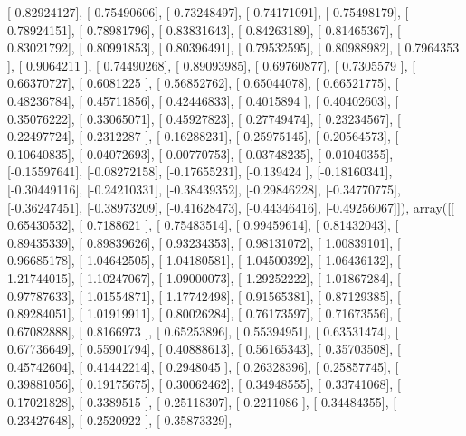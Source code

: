 \documentclass{article}
\begin{document}
       [ 0.82924127],
       [ 0.75490606],
       [ 0.73248497],
       [ 0.74171091],
       [ 0.75498179],
       [ 0.78924151],
       [ 0.78981796],
       [ 0.83831643],
       [ 0.84263189],
       [ 0.81465367],
       [ 0.83021792],
       [ 0.80991853],
       [ 0.80396491],
       [ 0.79532595],
       [ 0.80988982],
       [ 0.7964353 ],
       [ 0.9064211 ],
       [ 0.74490268],
       [ 0.89093985],
       [ 0.69760877],
       [ 0.7305579 ],
       [ 0.66370727],
       [ 0.6081225 ],
       [ 0.56852762],
       [ 0.65044078],
       [ 0.66521775],
       [ 0.48236784],
       [ 0.45711856],
       [ 0.42446833],
       [ 0.4015894 ],
       [ 0.40402603],
       [ 0.35076222],
       [ 0.33065071],
       [ 0.45927823],
       [ 0.27749474],
       [ 0.23234567],
       [ 0.22497724],
       [ 0.2312287 ],
       [ 0.16288231],
       [ 0.25975145],
       [ 0.20564573],
       [ 0.10640835],
       [ 0.04072693],
       [-0.00770753],
       [-0.03748235],
       [-0.01040355],
       [-0.15597641],
       [-0.08272158],
       [-0.17655231],
       [-0.139424  ],
       [-0.18160341],
       [-0.30449116],
       [-0.24210331],
       [-0.38439352],
       [-0.29846228],
       [-0.34770775],
       [-0.36247451],
       [-0.38973209],
       [-0.41628473],
       [-0.44346416],
       [-0.49256067]]), array([[ 0.65430532],
       [ 0.7188621 ],
       [ 0.75483514],
       [ 0.99459614],
       [ 0.81432043],
       [ 0.89435339],
       [ 0.89839626],
       [ 0.93234353],
       [ 0.98131072],
       [ 1.00839101],
       [ 0.96685178],
       [ 1.04642505],
       [ 1.04180581],
       [ 1.04500392],
       [ 1.06436132],
       [ 1.21744015],
       [ 1.10247067],
       [ 1.09000073],
       [ 1.29252222],
       [ 1.01867284],
       [ 0.97787633],
       [ 1.01554871],
       [ 1.17742498],
       [ 0.91565381],
       [ 0.87129385],
       [ 0.89284051],
       [ 1.01919911],
       [ 0.80026284],
       [ 0.76173597],
       [ 0.71673556],
       [ 0.67082888],
       [ 0.8166973 ],
       [ 0.65253896],
       [ 0.55394951],
       [ 0.63531474],
       [ 0.67736649],
       [ 0.55901794],
       [ 0.40888613],
       [ 0.56165343],
       [ 0.35703508],
       [ 0.45742604],
       [ 0.41442214],
       [ 0.2948045 ],
       [ 0.26328396],
       [ 0.25857745],
       [ 0.39881056],
       [ 0.19175675],
       [ 0.30062462],
       [ 0.34948555],
       [ 0.33741068],
       [ 0.17021828],
       [ 0.3389515 ],
       [ 0.25118307],
       [ 0.2211086 ],
       [ 0.34484355],
       [ 0.23427648],
       [ 0.2520922 ],
       [ 0.35873329],
\end{document}
